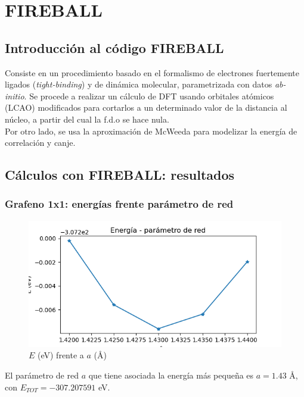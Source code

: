 \chapter{FIREBALL}
\section{Introducción al código FIREBALL}
Consiste en un procedimiento basado en el formalismo de electrones fuertemente ligados (\emph{tight-binding}) y de dinámica molecular, parametrizada con datos \emph{ab-initio}. Se procede a realizar un cálculo de DFT usando orbitales atómicos (LCAO) modificados para cortarlos a un determinado valor de la distancia al núcleo, a partir del cual la f.d.o se hace nula. \\


Por otro lado, se usa la aproximación de McWeeda para modelizar la energía de correlación y canje.
\section{Cálculos con FIREBALL: resultados}
\subsection{Grafeno 1x1: energías frente parámetro de red}
\begin{figure}[!h]
    \centering
    \includegraphics[scale=.8]{FIGURAS/En_param_graf1x1.png}
    \caption{$E$ (eV) frente a $a$ (\AA)}
    \label{fig:enter-label}
\end{figure}



El parámetro de red $a$ que tiene asociada la energía más pequeña es $a = 1.43 $ \AA, con $E_{TOT} = -307.207591$ eV.
